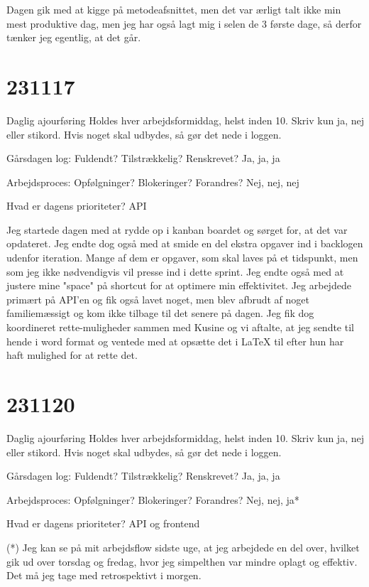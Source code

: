 \documentclass{report}
\begin{document}
Dagen gik med at kigge på metodeafsnittet, men det var ærligt talt ikke min mest produktive dag, men jeg har også lagt mig i selen de 3 første dage, så derfor tænker jeg egentlig, at det går.

\section{231117}
Daglig ajourføring
Holdes hver arbejdsformiddag, helst inden 10. Skriv kun ja, nej eller stikord. Hvis noget skal udbydes, så gør det nede i loggen.
 
Gårsdagen log: Fuldendt? Tilstrækkelig? Renskrevet?
Ja, ja, ja
 
Arbejdsproces: Opfølgninger? Blokeringer? Forandres?
Nej, nej, nej
 
Hvad er dagens prioriteter?
API
 
Jeg startede dagen med at rydde op i kanban boardet og sørget for, at det var opdateret.
Jeg endte dog også med at smide en del ekstra opgaver ind i backlogen udenfor iteration. Mange af dem er opgaver, som skal laves på et tidspunkt, men som jeg ikke nødvendigvis vil presse ind i dette sprint.
Jeg endte også med at justere mine "space" på shortcut for at optimere min effektivitet.
Jeg arbejdede primært på API'en og fik også lavet noget, men blev afbrudt af noget familiemæssigt og kom ikke tilbage til det senere på dagen.
Jeg fik dog koordineret rette-muligheder sammen med Kusine og vi aftalte, at jeg sendte til hende i word format og ventede med at opsætte det i LaTeX til efter hun har haft mulighed for at rette det.

\section{231120}
Daglig ajourføring
Holdes hver arbejdsformiddag, helst inden 10. Skriv kun ja, nej eller stikord. Hvis noget skal udbydes, så gør det nede i loggen.
 
Gårsdagen log: Fuldendt? Tilstrækkelig? Renskrevet?
Ja, ja, ja
 
Arbejdsproces: Opfølgninger? Blokeringer? Forandres?
Nej, nej, ja*
 
Hvad er dagens prioriteter?
API og frontend
 
(*) Jeg kan se på mit arbejdsflow sidste uge, at jeg arbejdede en del over, hvilket gik ud over torsdag og fredag, hvor jeg simpelthen var mindre oplagt og effektiv. Det må jeg tage med retrospektivt i morgen.
 
\end{document}
